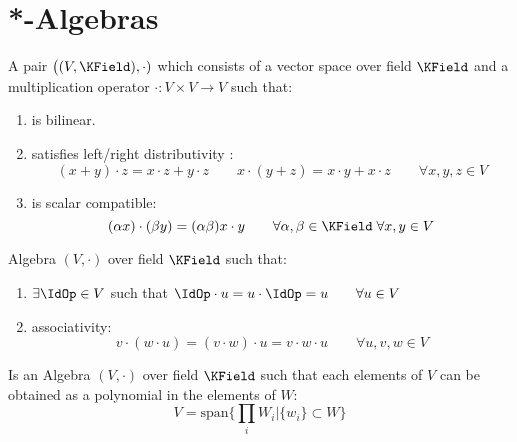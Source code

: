 \documentclass[a4paper,12pt]{scrartcl}    %
\begin{document}
\section{*-Algebras}

			\begin{definition}
				A pair $\big( (V,\KField), \cdot )$ which consists of a vector space over field $\KField$ and a multiplication operator $\cdot: V \times V \rightarrow V$ such that:
				\begin{enumerate}
					\item is bilinear.
					\item satisfies left/right distributivity :
						\begin{displaymath}
							(x+y) \cdot z = x \cdot z +y \cdot z \qquad x \cdot (y+z) = x \cdot y +x \cdot z \qquad \forall x,y,z \in V
						\end{displaymath}			
					\item is scalar compatible:	
						\begin{displaymath}
							(\alpha x) \cdot (\beta y) = (\alpha \beta) x \cdot y \qquad \forall \alpha,\beta \in \KField \; \forall x,y \in V
						\end{displaymath}						 
				\end{enumerate}		
			\end{definition}		

			\begin{definition}
				Algebra $(V,\cdot)$ over field $\KField$ such that:
				\begin{enumerate}
					\item $\exists \IdOp \in V$ such that $\IdOp \cdot u = u \cdot \IdOp = u \qquad \forall u \in V$
					\item associativity:
						\begin{displaymath}
							v \cdot ( w \cdot u) = (v \cdot w)\cdot u = v \cdot w \cdot u \qquad \forall u,v,w \in V
						\end{displaymath}
				\end{enumerate}
			\end{definition}		

			\begin{definition}
				Is an Algebra $(V,\cdot)$ over field $\KField$ such that each elements of $V$ can be obtained as a polynomial in the elements of $W$:
				\begin{displaymath}
					V = \textrm{span}\big\{\prod_i W_i \big\vert \{w_i\} \subset W \big\}
				\end{displaymath}
			\end{definition}		
			
\end{document}
